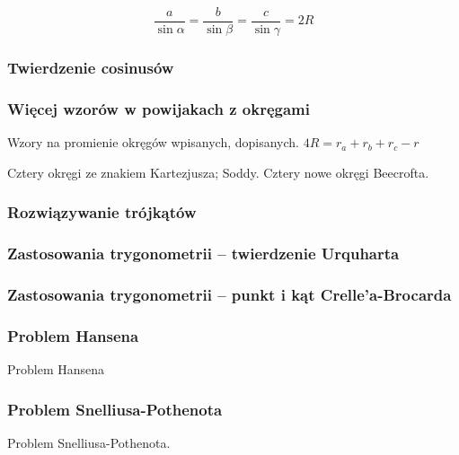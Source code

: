 $$\frac{a}{\sin \alpha} = \frac{b}{\sin \beta} = \frac{c}{\sin \gamma} = 2R$$

\subsubsection{Twierdzenie cosinusów}


\subsubsection{Więcej wzorów w powijakach z okręgami}
Wzory na promienie okręgów wpisanych, dopisanych.
$4R = r_a + r_b + r_c - r$ %

Cztery okręgi ze znakiem Kartezjusza; Soddy.
Cztery nowe okręgi Beecrofta.

\subsubsection{Rozwiązywanie trójkątów}


\subsubsection{Zastosowania trygonometrii -- twierdzenie Urquharta}


\subsubsection{Zastosowania trygonometrii -- punkt i kąt Crelle'a-Brocarda}


\subsubsection{Problem Hansena}
Problem Hansena
%

\subsubsection{Problem Snelliusa-Pothenota}
Problem Snelliusa-Pothenota.
%

